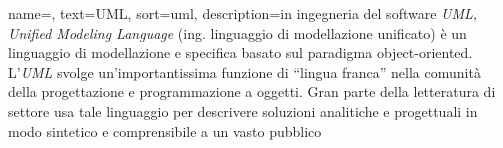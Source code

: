 {
    name=,
    text=UML,
    sort=uml,
    description={in ingegneria del software \emph{UML, Unified Modeling Language} (ing. linguaggio di modellazione unificato) è un linguaggio di modellazione e specifica basato sul paradigma object-oriented. L'\emph{UML} svolge un'importantissima funzione di ``lingua franca'' nella comunità della progettazione e programmazione a oggetti. Gran parte della letteratura di settore usa tale linguaggio per descrivere soluzioni analitiche e progettuali in modo sintetico e comprensibile a un vasto pubblico}
}

